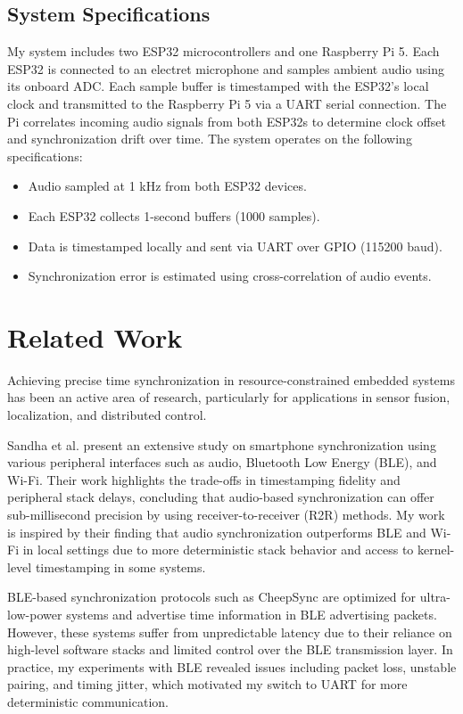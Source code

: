 \documentclass[sigconf]{acmart}
\begin{document}
\subsection{System Specifications}
My system includes two ESP32 microcontrollers and one Raspberry Pi 5. Each ESP32 is connected to an electret microphone and samples ambient audio using its onboard ADC. Each sample buffer is timestamped with the ESP32’s local clock and transmitted to the Raspberry Pi 5 via a UART serial connection. The Pi correlates incoming audio signals from both ESP32s to determine clock offset and synchronization drift over time. The system operates on the following specifications:
\begin{itemize}
  \item Audio sampled at 1 kHz from both ESP32 devices.
  \item Each ESP32 collects 1-second buffers (1000 samples).
  \item Data is timestamped locally and sent via UART over GPIO (115200 baud).
  \item Synchronization error is estimated using cross-correlation of audio events.
\end{itemize}

\section{Related Work}
Achieving precise time synchronization in resource-constrained embedded systems has been an active area of research, particularly for applications in sensor fusion, localization, and distributed control. 

Sandha et al. \cite{sandha2019smartphone} present an extensive study on smartphone synchronization using various peripheral interfaces such as audio, Bluetooth Low Energy (BLE), and Wi-Fi. Their work highlights the trade-offs in timestamping fidelity and peripheral stack delays, concluding that audio-based synchronization can offer sub-millisecond precision by using receiver-to-receiver (R2R) methods. My work is inspired by their finding that audio synchronization outperforms BLE and Wi-Fi in local settings due to more deterministic stack behavior and access to kernel-level timestamping in some systems.

BLE-based synchronization protocols such as CheepSync \cite{sridhar2016cheepsync} are optimized for ultra-low-power systems and advertise time information in BLE advertising packets. However, these systems suffer from unpredictable latency due to their reliance on high-level software stacks and limited control over the BLE transmission layer. In practice, my experiments with BLE revealed issues including packet loss, unstable pairing, and timing jitter, which motivated my switch to UART for more deterministic communication.
\end{document}
